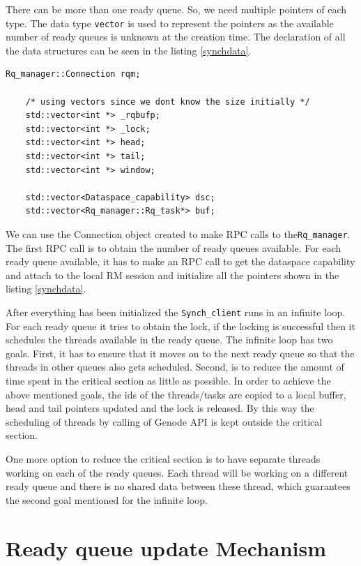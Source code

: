 There can be more than one ready queue. So, we need multiple pointers of each type. The data type \texttt{vector} is used to represent the pointers as the available number of ready queues is unknown at the creation time. The declaration of all the data structures can be seen in the listing \ref{synchdata}. 

\begin{lstlisting}[caption={Data structures used in Synch\_client},label={synchdata}, style=customcpp]
	Rq_manager::Connection rqm;
	
	/* using vectors since we dont know the size initially */
	std::vector<int *> _rqbufp;
	std::vector<int *> _lock;
	std::vector<int *> head; 
	std::vector<int *> tail; 
	std::vector<int *> window;
	
	std::vector<Dataspace_capability> dsc;
	std::vector<Rq_manager::Rq_task*> buf;
\end{lstlisting}

We can use the Connection object created to make RPC calls to the\texttt{Rq\_manager}. The first RPC call is to obtain the number of ready queues available. For each ready queue available, it has to make an RPC call to get the dataspace capability and attach to the local RM session and initialize all the pointers shown in the listing \ref{synchdata}. 

After everything has been initialized the \texttt{Synch\_client} runs in an infinite loop. For each ready queue it tries to obtain the lock, if the locking is successful then it schedules the threads available in the ready queue. The infinite loop has two goals. First, it has to ensure that it moves on to the next ready queue so that the threads in other queues also gets scheduled. Second, is to reduce the amount of time spent in the critical section as little as possible. In order to achieve the above mentioned goals, the ids of the threads/tasks are copied to a local buffer, head and tail pointers updated and the lock is released. By this way the scheduling of threads by calling of Genode API is kept outside the critical section.

One more option to reduce the critical section is to have separate threads working on each of the ready queues. Each thread will be working on a different ready queue and there is no shared data between these thread, which guarantees the second goal mentioned for the infinite loop. 
 
\section{Ready queue update Mechanism}

